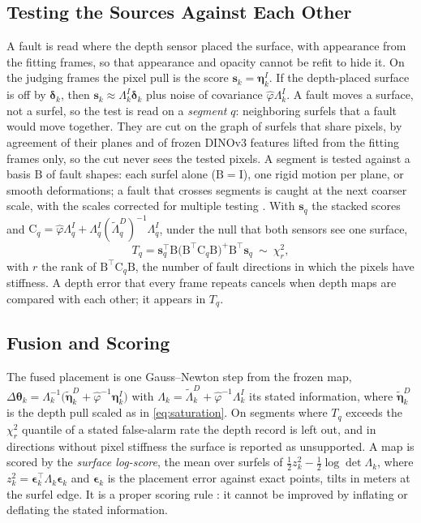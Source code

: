 \subsection{Testing the Sources Against Each Other}
\label{sec:method:test}
A fault is read where the depth sensor placed the surface, with appearance from the fitting frames, so
that appearance and opacity cannot be refit to hide it. On the judging frames the pixel pull is the score
$\mathbf s_k=\boldsymbol\eta^{I}_{k}$. If the depth-placed surface is off by $\boldsymbol\delta_k$, then
$\mathbf s_k\approx\Lambda^{I}_k\boldsymbol\delta_k$ plus noise of covariance $\hat\varphi\Lambda^{I}_k$.
A fault moves a surface, not a surfel, so the test is read on a \emph{segment} $q$: neighboring surfels
that a fault would move together. They are cut on the graph of surfels that share pixels, by agreement of
their planes and of frozen DINOv3 features \cite{feat_dinov3} lifted from the fitting frames only, so the
cut never sees the tested pixels. A segment is tested
against a basis $\mathrm B$ of fault shapes: each surfel alone ($\mathrm B=\mathrm I$), one rigid
motion per plane, or smooth deformations; a fault that crosses segments is caught at the next coarser
scale, with the scales corrected for multiple testing \cite{stat_holm}. With
$\mathbf s_q$ the stacked scores and
$\mathrm C_q=\hat\varphi\Lambda^{I}_q+\Lambda^{I}_q(\tilde\Lambda^{D}_q)^{-1}\Lambda^{I}_q$,
under the null that both sensors see one surface,
\begin{equation}
T_q=\mathbf s_q^{\top}\mathrm B\bigl(\mathrm B^{\top}\mathrm C_q\mathrm B\bigr)^{+}\mathrm B^{\top}\mathbf s_q\ \sim\ \chi^{2}_{r},
\label{eq:tension}
\end{equation}
with $r$ the rank of $\mathrm B^{\top}\mathrm C_q\mathrm B$, the number of fault directions in which the
pixels have stiffness. A depth error that every frame repeats cancels when depth maps are compared with
each other; it appears in $T_q$.

\subsection{Fusion and Scoring}
\label{sec:method:fusion}
The fused placement is one Gauss--Newton step from the frozen map,
$\Delta\boldsymbol\theta_k=\Lambda_k^{-1}\bigl(\tilde{\boldsymbol\eta}^{D}_{k}+\hat\varphi^{-1}\boldsymbol\eta^{I}_{k}\bigr)$
with $\Lambda_k=\tilde\Lambda^{D}_{k}+\hat\varphi^{-1}\Lambda^{I}_{k}$ its stated information, where
$\tilde{\boldsymbol\eta}^{D}_{k}$ is the depth pull scaled as in \eqref{eq:saturation}. On segments where
$T_q$ exceeds the $\chi^2_r$ quantile of a stated false-alarm rate the depth record is left out, and in
directions without pixel stiffness the surface is reported as unsupported. A map is scored by the
\emph{surface log-score}, the mean over surfels of $\tfrac12 z_k^2-\tfrac12\log\det\Lambda_k$, where
$z_k^2=\boldsymbol\epsilon_k^{\top}\Lambda_k\boldsymbol\epsilon_k$ and $\boldsymbol\epsilon_k$ is the
placement error against exact points, tilts in meters at the surfel edge. It is a proper scoring rule
\cite{stat_gneiting_scoring}: it cannot be improved by inflating or deflating the stated information.
